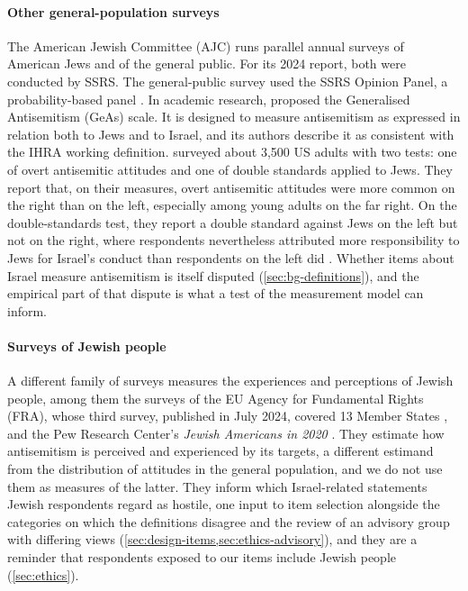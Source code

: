 \paragraph{Other general-population surveys}
The American Jewish Committee (AJC) runs parallel annual surveys of American Jews and of the general public. For its 2024 report, both were conducted by SSRS. The general-public survey used the SSRS Opinion Panel, a probability-based panel \citep{ajc2024general,ajc2024jews}. In academic research, \citet{allington2022} proposed the Generalised Antisemitism (GeAs) scale. It is designed to measure antisemitism as expressed in relation both to Jews and to Israel, and its authors describe it as consistent with the IHRA working definition.  surveyed about 3,500 US adults with two tests: one of overt antisemitic attitudes and one of double standards applied to Jews. They report that, on their measures, overt antisemitic attitudes were more common on the right than on the left, especially among young adults on the far right. On the double-standards test, they report a double standard against Jews on the left but not on the right, where respondents nevertheless attributed more responsibility to Jews for Israel's conduct than respondents on the left did \citep{hersh2023}. Whether items about Israel measure antisemitism is itself disputed (\cref{sec:bg-definitions}), and the empirical part of that dispute is what a test of the measurement model can inform.

\paragraph{Surveys of Jewish people}
A different family of surveys measures the experiences and perceptions of Jewish people, among them the surveys of the EU Agency for Fundamental Rights (FRA), whose third survey, published in July 2024, covered 13 Member States \citep{fra2018antisemitism,fra2024antisemitism}, and the Pew Research Center's \emph{Jewish Americans in 2020} \citep{pew2021jewish}. They estimate how antisemitism is perceived and experienced by its targets, a different estimand from the distribution of attitudes in the general population, and we do not use them as measures of the latter. They inform which Israel-related statements Jewish respondents regard as hostile, one input to item selection alongside the categories on which the definitions disagree and the review of an advisory group with differing views (\cref{sec:design-items,sec:ethics-advisory}), and they are a reminder that respondents exposed to our items include Jewish people (\cref{sec:ethics}).


